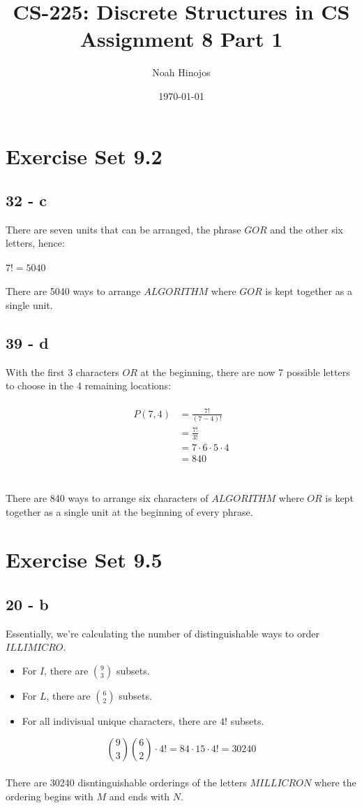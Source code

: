 \documentclass[12pt]{article}
\title{
  \textbf{CS-225: Discrete Structures in CS} \\
  Assignment 8 Part 1
  }
\author{Noah Hinojos}
\date{\today}
\newcommand{\xlist}[1]{
    \begin{itemize}
        \renewcommand{\labelitemi}{$\centerdot$}
        #1
    \end{itemize}
    \newblock
}
\begin{document}
\maketitle
\section*{Exercise Set 9.2}
\subsection*{32 - c}
There are seven units that can be arranged, the phrase $GOR$ and the other six letters, hence:
\\ \\
$7! = 5040$
\\ \\
There are 5040 ways to arrange $ALGORITHM$ where $GOR$ is kept together as a single unit. 
\subsection*{39 - d}
With the first 3 characters $OR$ at the beginning, there are now 7 possible letters to choose in the 4 remaining locations:
\\ \\
\begin{align*}
  P(7, 4) &= \frac{7!}{(7-4)!} \\
  &= \frac{7!}{3!} \\
  &= 7 \cdot 6 \cdot 5 \cdot 4 \\  
  &= 840
\end{align*}
\\ \\
There are 840 ways to arrange six characters of $ALGORITHM$ where $OR$ is kept together as a single unit at the beginning of every phrase.
\section*{Exercise Set 9.5}
\subsection*{20 - b}
Essentially, we're calculating the number of distinguishable ways to order $ILLIMICRO$.
\xlist{
  \item For $I$, there are $\binom{9}{3}$ subsets.
  \item For $L$, there are $\binom{6}{2}$ subsets.
  \item For all indivisual unique characters, there are $4!$ subsets.
}
$$\binom{9}{3}\binom{6}{2}\cdot4! = 84\cdot15\cdot4! =30240$$
\\
There are 30240 disntinguishable orderings of the letters $MILLICRON$ where the ordering begins with $M$ and ends with $N$.
\end{document}
